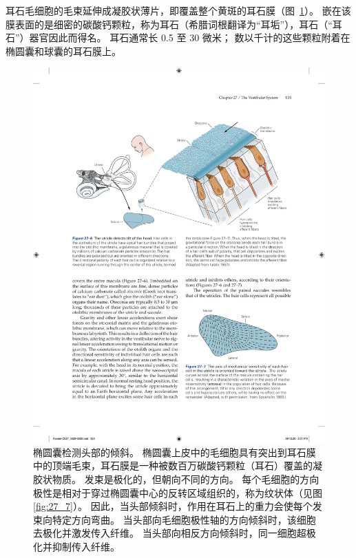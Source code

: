 耳石毛细胞的毛束延伸成凝胶状薄片，即覆盖整个黄斑的耳石膜（图~\ref{fig:27_6}）。
嵌在该膜表面的是细密的碳酸钙颗粒，称为耳石（希腊词根翻译为“耳垢”），耳石（“耳石”）器官因此而得名。
耳石通常长 0.5 至 30 微米；
数以千计的这些颗粒附着在椭圆囊和球囊的耳石膜上。


\begin{figure}[htbp]
	\centering
	\includegraphics[width=0.9\linewidth]{chap27/fig_27_6}
	\caption{椭圆囊检测头部的倾斜。
		椭圆囊上皮中的毛细胞具有突出到耳石膜中的顶端毛束，耳石膜是一种被数百万碳酸钙颗粒（耳石）覆盖的凝胶状物质。
		发束是极化的，但朝向不同的方向。 每个毛细胞的方向极性是相对于穿过椭圆囊中心的反转区域组织的，称为纹状体（见图 \ref{fig:27_7}）。
		因此，当头部倾斜时，作用在耳石上的重力会使每个发束向特定方向弯曲。
		当头部向毛细胞极性轴的方向倾斜时，该细胞去极化并激发传入纤维。
		当头部向相反方向倾斜时，同一细胞超极化并抑制传入纤维\cite{iurato2013submicroscopic}。}
	\label{fig:27_6}
\end{figure}


